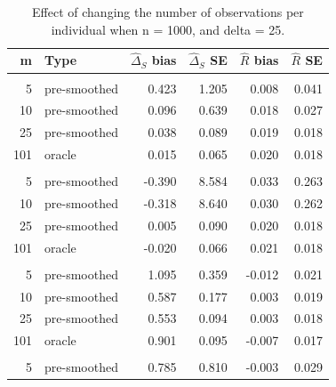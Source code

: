 \documentclass[useAMS,usenatbib,referee]{biom}
\begin{document}
\begin{table}[t]

\caption{\label{tab:large-n-all-nl}Effect of changing the number of observations per individual when n = 1000, and delta = 25.}
\centering
\begin{tabular}{rlrrrr}
\toprule
m & Type & $\widehat{\Delta}_S$ bias & $\widehat{\Delta}_S$ SE & $\widehat{R}$ bias & $\widehat{R}$ SE\\
\midrule
\addlinespace[0.3em]
\multicolumn{6}{l}{\textbf{GAM}}\\
\hspace{1em}5 & pre-smoothed & 0.423 & 1.205 & 0.008 & 0.041\\
\hspace{1em}10 & pre-smoothed & 0.096 & 0.639 & 0.018 & 0.027\\
\hspace{1em}25 & pre-smoothed & 0.038 & 0.089 & 0.019 & 0.018\\
\hspace{1em}101 & oracle & 0.015 & 0.065 & 0.020 & 0.018\\
\addlinespace[0.3em]
\multicolumn{6}{l}{\textbf{GAM-unsmoothed}}\\
\hspace{1em}5 & pre-smoothed & -0.390 & 8.584 & 0.033 & 0.263\\
\hspace{1em}10 & pre-smoothed & -0.318 & 8.640 & 0.030 & 0.262\\
\hspace{1em}25 & pre-smoothed & 0.005 & 0.090 & 0.020 & 0.018\\
\hspace{1em}101 & oracle & -0.020 & 0.066 & 0.021 & 0.018\\
\addlinespace[0.3em]
\multicolumn{6}{l}{\textbf{Kernel}}\\
\hspace{1em}5 & pre-smoothed & 1.095 & 0.359 & -0.012 & 0.021\\
\hspace{1em}10 & pre-smoothed & 0.587 & 0.177 & 0.003 & 0.019\\
\hspace{1em}25 & pre-smoothed & 0.553 & 0.094 & 0.003 & 0.018\\
\hspace{1em}101 & oracle & 0.901 & 0.095 & -0.007 & 0.017\\
\addlinespace[0.3em]
\multicolumn{6}{l}{\textbf{Linear}}\\
\hspace{1em}5 & pre-smoothed & 0.785 & 0.810 & -0.003 & 0.029\\

\end{tabular}
\end{table}
\end{document}
